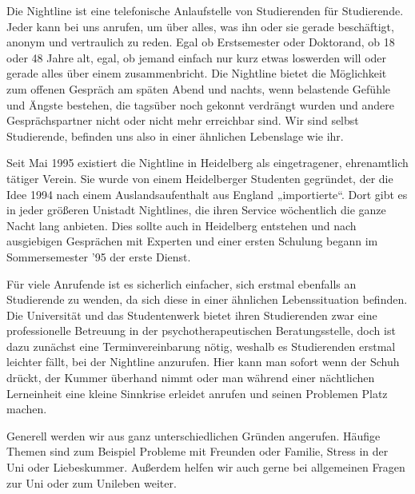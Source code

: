 \newpage
{}%
Die Nightline ist eine telefonische Anlaufstelle von Studierenden für Studierende. 
Jeder kann bei uns anrufen, um über alles, was ihn oder sie gerade beschäftigt, 
anonym und vertraulich zu reden. Egal ob Erstsemester oder Doktorand, ob 18 oder 48 
Jahre alt, egal, ob jemand einfach nur kurz etwas loswerden will oder gerade alles 
über einem zusammenbricht. Die Nightline bietet die Möglichkeit zum offenen Gespräch 
am späten Abend und nachts, wenn belastende Gefühle und Ängste bestehen, die 
tagsüber noch gekonnt verdrängt wurden und andere Gesprächspartner nicht oder nicht 
mehr erreichbar sind. Wir sind selbst Studierende, befinden uns also in einer 
ähnlichen Lebenslage wie ihr.


Seit Mai 1995 existiert die Nightline in Heidelberg als eingetragener, ehrenamtlich 
tätiger Verein. Sie wurde von einem Heidelberger Studenten gegründet, der die Idee 
1994 nach einem Auslandsaufenthalt aus England „importierte“. Dort gibt es in jeder 
größeren Unistadt Nightlines, die ihren Service wöchentlich die ganze Nacht lang 
anbieten. Dies sollte auch in Heidelberg entstehen und nach ausgiebigen Gesprächen 
mit Experten und einer ersten Schulung begann im Sommersemester '95 der erste 
Dienst.

Für viele Anrufende ist es sicherlich einfacher, sich erstmal ebenfalls an 
Studierende zu wenden, da sich diese in einer ähnlichen Lebenssituation befinden. 
Die Universität und das Studentenwerk bietet ihren Studierenden zwar eine 
professionelle Betreuung in der psychotherapeutischen Beratungsstelle, doch ist dazu 
zunächst eine Terminvereinbarung nötig, weshalb es Studierenden erstmal leichter 
fällt, bei der Nightline anzurufen. Hier kann man sofort wenn der Schuh drückt, der 
Kummer überhand nimmt oder man während einer nächtlichen Lerneinheit eine kleine 
Sinnkrise erleidet anrufen und seinen Problemen Platz machen.

Generell werden wir aus ganz unterschiedlichen Gründen angerufen. Häufige Themen 
sind zum Beispiel Probleme mit Freunden oder Familie, Stress in der Uni oder 
Liebeskummer. Außerdem helfen wir auch gerne bei allgemeinen Fragen zur Uni oder zum 
Unileben weiter.

